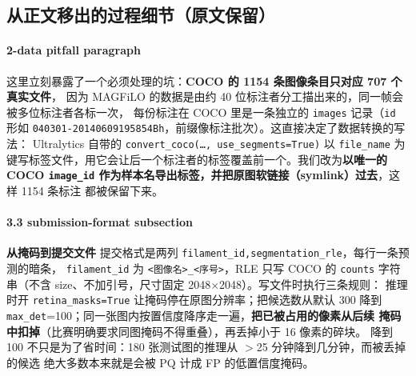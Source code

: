 \documentclass{article}
\begin{document}
\begin{table}[t]
\centering
\caption{GT 口径实测（同一批预测，只更换 ground truth 口径）。交叉验证：P0 与旧评测
代码在 \texttt{conf}$=$0.10 下的输出\textbf{逐位一致}，说明重写是忠实的。}
\label{tab:gtprotocol}
\small
\setlength{\tabcolsep}{4pt}
\end{table}


\subsection{从正文移出的过程细节（原文保留）}

\paragraph{2-data pitfall paragraph}
这里立刻暴露了一个必须处理的坑：\textbf{COCO 的 1154 条图像条目只对应 707 个真实文件}，
因为 MAGFiLO 的数据是由约 40 位标注者分工描出来的，同一帧会被多位标注者各标一次，
每份标注在 COCO 里是一条独立的 \texttt{images} 记录（\texttt{id} 形如
\texttt{040301-20140609195854Bh}，前缀像标注批次）。这直接决定了数据转换的写法：
Ultralytics 自带的 \texttt{convert\_coco(\dots, use\_segments=True)} 以 \texttt{file\_name}
为键写标签文件，用它会让后一个标注者的标签覆盖前一个。我们改为\textbf{以唯一的 COCO
\texttt{image\_id} 作为样本名导出标签，并把原图软链接（symlink）过去}，这样 1154 条标注
都被保留下来。

\paragraph{3.3 submission-format subsection}
\textbf{从掩码到提交文件}
提交格式是两列 \texttt{filament\_id,segmentation\_rle}，每行一条预测的暗条，
\texttt{filament\_id} 为 \texttt{<图像名>\_<序号>}，RLE 只写 COCO 的 \texttt{counts}
字符串（不含 size、不加引号，尺寸固定 2048$\times$2048）。写文件时执行三条规则：
推理时开 \texttt{retina\_masks=True} 让掩码停在原图分辨率；把候选数从默认 300 降到
\texttt{max\_det}=100；同一张图内按置信度降序走一遍，\textbf{把已被占用的像素从后续
掩码中扣掉}（比赛明确要求同图掩码不得重叠），再丢掉小于 16 像素的碎块。
降到 100 不只是为了省时间：180 张测试图的推理从 $>$25 分钟降到几分钟，而被丢掉的候选
绝大多数本来就是会被 PQ 计成 FP 的低置信度掩码。
\end{document}
